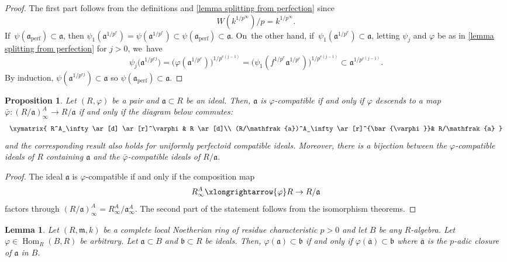 \documentclass[JEP,XML,SOM,Unicode,published]{cedram}
\let\autoref\cref
\theoremstyle{plain}
\newtheorem{proposition}[theorem]{Proposition}
\newtheorem{lemma}[theorem]{Lemma}
\theoremstyle{definition}
\numberwithin{equation}{theorem}
\newcommand{\fra}{\mathfrak{a}}
\newcommand{\frab}{\mathfrak{b}}
\newcommand{\fram}{\mathfrak{m}}
\DeclareMathOperator{\Hom}{Hom}
\newcommand{\perf}{_{\mathrm{perf}}}
\newcommand{\unpe}{{1/{p^e}}}
\renewcommand{\phi}{\varphi}
\newcommand{\rphi}{(R,\phi)}
\newcommand{\unpfty}{{1/p^\infty}}
\newcommand{\rafty}{R^A_\infty}
\newcommand{\aafty}{\fra^A_\infty}
\begin{document}
\begin{proof}
The first part follows from the definitions and \autoref{lemma splitting from perfection} since
\[
W(k^\unpfty)/p=k^\unpfty.
\]
If~$\psi(\fra\perf)\subset\fra$, then $\psi_1(\fra^\unpe)=\psi(\fra^\unpe)\subset\psi(\fra\perf) \subset \fra$. On~the other hand, if~$\psi_1(\fra^\unpe)\subset \fra$,
letting $\psi_j$ and $\phi$ be as in \autoref{lemma splitting from perfection} for $j>0$, we~have
\[
\psi_j\bigl(\fra^{1/p^{ej}}\bigl)=\bigl(\phi(\fra^{1/p^{e}})\bigr)^{1/p^{e(j-1)}}=\bigl(\psi_1(f^\unpe\fra^\unpe) \bigr)^{1/p^{e(j-1)}}\subset \fra^{1/p^{e(j-1)}}.
\]
By induction, $\psi(\fra^{1/p^{ej}})\subset \fra$ so $\psi(\fra\perf)\subset \fra$.
\end{proof}

\begin{proposition}\label{compatible equivalent to comm diag quotient}
Let $\rphi$ be a pair and $\fra\subset R$ be an ideal. Then, $\fra$ is $\phi$\nobreakdash-compatible if and only if $\phi$ descends to a map $\bar{\phi}\colon(R/\fra)^A_\infty\to R/\fra$ \ie if and only if the diagram below commutes:\vspace*{-5pt}
\begin{equation}\label{comm diag quotient comp ideal}
\begin{array}{c}
\xymatrix{
\rafty \ar[d] \ar[r]^\phi & R \ar[d]\\
(R/\fra)^A_\infty\ar[r]^{\bar{\phi}}& R/\fra
}
\end{array}
\end{equation}
and the corresponding result also holds for uniformly perfectoid compatible ideals.
Moreover, there is a bijection between the $\phi$-compatible ideals of $R$ containing $\fra$ and the $\bar{\phi}$-compatible ideals of $R/\fra$.
\end{proposition}

\begin{proof}
The ideal $\fra$ is $\phi$-compatible if and only if the composition map
\[\rafty\xlongrightarrow{\phi} R\to R/\fra
\]factors through $(R/\fra)_\infty^A=\rafty/\aafty$. The second part of the statement follows from the isomorphism theorems.
\end{proof}

\begin{lemma}\label{p adic closure of comp ideal}
Let $(R,\fram, k)$ be a complete local Noetherian ring of residue characteristic $p>0$ and let $B$ be any $R$\nobreakdash-algebra. Let $\phi\in \Hom_R(B,R)$ be arbitrary. Let $\fra\subset B$ and $\frab\subset R$ be ideals. Then, $\phi(\fra)\subset \frab$ if and only if $\phi(\bar{\fra})\subset \frab$ where $\bar{\fra}$ is the $p$-adic closure of $\fra$ in $B$.
\end{lemma}
\end{document}

